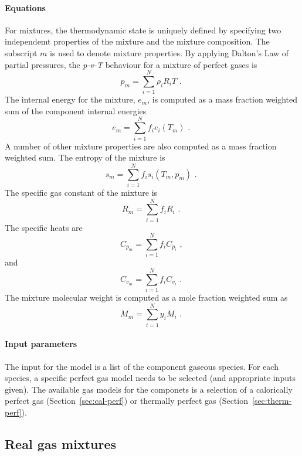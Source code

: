 \paragraph{Equations}
For mixtures, the thermodynamic state is uniquely defined
by specifying two independemt properties of the mixture and the mixture
composition.
The subscript $m$ is used to denote mixture properties.
By applying Dalton's Law of partial pressures, the
\textit{p-v-T} behaviour for a mixture of perfect
gases is
\begin{equation}
 p_m = \sum_{i=1}^N \rho_i R_i T \text{ . }
\end{equation}
The internal energy for the mixture, $e_m$, is computed as
a mass fraction weighted sum of the component
internal energies
\begin{equation}
 e_m = \sum_{i=1}^N f_i e_i(T_m) \text{ . }
\end{equation}
A number of other mixture properties are also computed
as a mass fraction weighted sum.
The entropy of the mixture is
\begin{equation}
 s_m = \sum_{i=1}^N f_i s_i(T_m, p_m) \text{ . }
\end{equation}
The specific gas constant of the mixture is
\begin{equation}
 R_m = \sum_{i=1}^N f_i R_i \text{ . }
\end{equation}
The specific heats are
\begin{equation}
  C_{p_m} = \sum_{i=1}^N f_i C_{p_i} \text{ , }
\end{equation}
and
\begin{equation}
  C_{v_m} = \sum_{i=1}^N f_i C_{v_i} \text{ . }
\end{equation}
The mixture molecular weight is computed as a mole fraction
weighted sum as
\begin{equation}
  M_m = \sum_{i=1}^N y_i M_i \text{ . }
\end{equation}

\paragraph{Input parameters}
The input for the model is a list of the component gaseous species.
For each species, a specific perfect gas model needs to be selected
(and appropriate inputs given).
The available gas models for the componets is a selection of a calorically perfect
gas (Section~\ref{sec:cal-perf}) or thermally perfect gas (Section~\ref{sec:therm-perf}).

\subsection{Real gas mixtures}
\label{sec:real-gas-mix}
